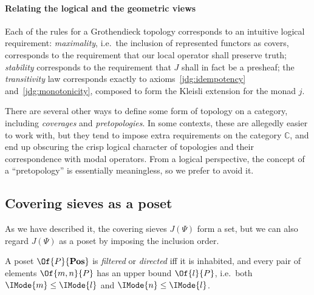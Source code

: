 \documentclass{article}
\newcommand\Posets{\mathbf{Pos}}
\begin{document}
\paragraph{Relating the logical and the geometric views}

Each of the rules for a Grothendieck topology corresponds to an
intuitive logical requirement: \emph{maximality}, i.e.\ the inclusion
of represented functors as covers, corresponds to the requirement that
our local operator shall preserve truth; \emph{stability} corresponds
to the requirement that $J$ shall in fact be a presheaf; the
\emph{transitivity} law corresponds exactly to
axioms~\ref{jdg:idempotency} and~\ref{jdg:monotonicity}, composed to
form the Kleisli extension for the monad $j$.

\begin{remark}
  There are several other ways to define some form of topology on a
  category, including \emph{coverages} and \emph{pretopologies}. In
  some contexts, these are allegedly easier to work with, but they
  tend to impose extra requirements on the category $\mathbb{C}$, and
  end up obscuring the crisp logical character of topologies and their
  correspondence with modal operators. From a logical perspective, the
  concept of a ``pretopology'' is essentially meaningless, so we
  prefer to avoid it.
\end{remark}

\subsection{Covering sieves as a poset}
\newcommand\IsLEQ[2]{\IMode{#1}\leq\IMode{#2}}

As we have described it, the covering sieves $J(\Psi)$ form a set, but
we can also regard $J(\Psi)$ as a poset by imposing the inclusion
order.

\begin{definition}
  A poset $\Of{P}{\Posets}$ is \emph{filtered} or \emph{directed} iff
  it is inhabited, and every pair of elements $\Of{m,n}{P}$ has an
  upper bound $\Of{l}{P}$, i.e.\ both $\IsLEQ{m}{l}$ and
  $\IsLEQ{n}{l}$.
\end{definition}
\end{document}

